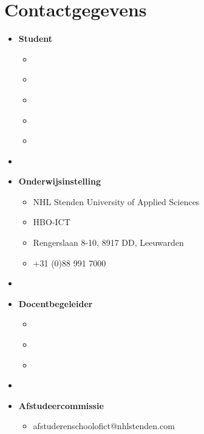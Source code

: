 \thispagestyle{empty}

\section*{Contactgegevens}

\begin{itemize}
	\item[]\textbf{Student}\
	      \begin{itemize}
		      \item[]{ \StudentName}
		      \item[]{ \StudentNumber}
		      \item[]{ \AcedemicYear}
		      \item[]{ \StudentEmail}
		      \item[]{ \StudentPhone}
	      \end{itemize}

	\item[]

	\item[]\textbf{Onderwijsinstelling}\
	      \begin{itemize}
		      \item[]{ NHL Stenden University of Applied Sciences}
		      \item[]{ HBO-ICT}
		      \item[]{\makebox[5cm][l]{Locatie} Rengerslaan 8-10, 8917 DD, Leeuwarden}
		      \item[]{ +31 (0)88 991 7000}
	      \end{itemize}

	\item[]

	\item[]\textbf{Docentbegeleider}\
	      \begin{itemize}
		      \item[]{ \LecturerName}
		      \item[]{ \LecturerEmail}
		      \item[]{ \LecturePhone}
	      \end{itemize}

	\item[]

	\item[]\textbf{Afstudeercommissie}\
	      \begin{itemize}
		      \item[]{ afstuderenschoolofict@nhlstenden.com}
	      \end{itemize}


\end{itemize}
